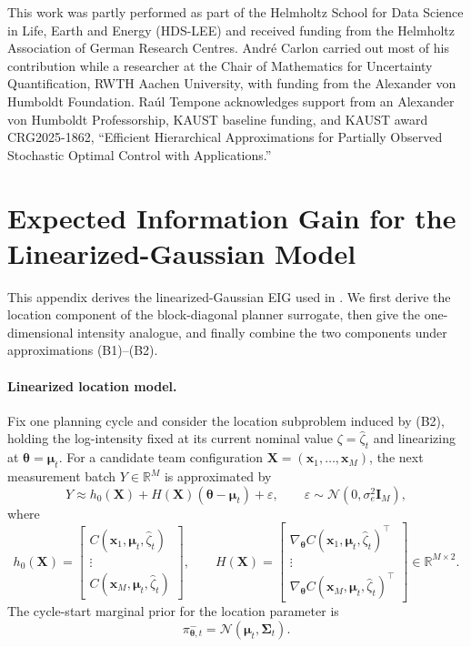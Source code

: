 \documentclass{article}
\newcommand{\R}{\mathbb{R}}
\newcommand{\bs}[1]{\boldsymbol{#1}}
\newcommand{\x}{\mathbf{x}}
\newcommand{\bX}{\mathbf{X}}
\begin{document}
This work was partly performed as part of the Helmholtz School for Data Science in Life, Earth and Energy (HDS-LEE) and received funding from the Helmholtz Association of German Research Centres.
André Carlon carried out most of his contribution while a researcher at the Chair of Mathematics for Uncertainty Quantification, RWTH Aachen University, with funding from the Alexander von Humboldt Foundation.
Raúl Tempone acknowledges support from an Alexander von Humboldt Professorship, KAUST baseline funding, and KAUST award CRG2025-1862, ``Efficient Hierarchical Approximations for Partially Observed Stochastic Optimal Control with Applications.''

\appendix

\section{Expected Information Gain for the Linearized-Gaussian Model}
\label{app:eig}
This appendix derives the linearized-Gaussian EIG used in .
We first derive the location component of the block-diagonal planner surrogate, then give the one-dimensional intensity analogue, and finally combine the two components under approximations (B1)--(B2).

\paragraph{Linearized location model.}
Fix one planning cycle and consider the location subproblem induced by (B2), holding the log-intensity fixed at its current nominal value $\zeta=\hat\zeta_t$ and linearizing at $\bs\theta=\bs\mu_t$.
For a candidate team configuration $\bX=(\x_1,\dots,\x_M)$, the next measurement batch $Y\in\R^M$ is approximated by
\begin{equation}
\label{eq:app_linear_obs}
Y \approx h_0(\bX) + H(\bX)(\bs\theta-\bs\mu_t) + \varepsilon,
\qquad
\varepsilon\sim\mathcal N(0,\sigma_e^2 \bs I_M),
\end{equation}
where
\begin{equation}
h_0(\bX)=
\begin{bmatrix}
C(\x_1,\bs\mu_t,\hat\zeta_t)\\[-1mm]
\vdots\\[-1mm]
C(\x_M,\bs\mu_t,\hat\zeta_t)
\end{bmatrix},
\qquad
H(\bX)=
\begin{bmatrix}
\nabla_{\bs\theta}C(\x_1,\bs\mu_t,\hat\zeta_t)^\top\\[-1mm]
\vdots\\[-1mm]
\nabla_{\bs\theta}C(\x_M,\bs\mu_t,\hat\zeta_t)^\top
\end{bmatrix}\in\R^{M\times 2}.
\end{equation}
The cycle-start marginal prior for the location parameter is
\begin{equation}
\pi_{\bs\theta,t}^-
=\mathcal N(\bs\mu_t,\bs\Sigma_t).
\end{equation}
\end{document}
